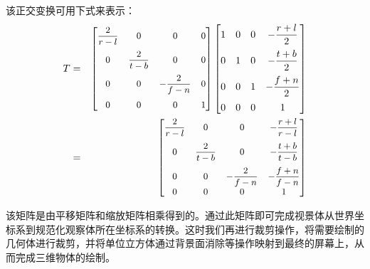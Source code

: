 该正交变换可用下式来表示：
\begin{eqnarray}       %
T& = &
\begin{small}
\begin{bmatrix}
\vspace{0.2cm}
    \displaystyle\frac{2}{r-l} & 0 & 0 & 0\\  %
\vspace{0.2cm}
    0 & \displaystyle\frac{2}{t-b} & 0 & 0\\  %
\vspace{0.2cm}
    0 & 0 & \displaystyle-\frac{2}{f-n} & 0\\  %
    0 & 0 & 0 & 1\\%
\end{bmatrix}
\end{small}
\begin{bmatrix}
\vspace{0.2cm}
    1 & 0 & 0 & \displaystyle-\frac{r+l}{2}\\  %
\vspace{0.2cm}
    0 & 1 & 0 & \displaystyle-\frac{t+b}{2}\\  %
\vspace{0.2cm}
    0 & 0 & 1 & \displaystyle-\frac{f+n}{2}\\  %
    0 & 0 & 0 & 1\\%
\end{bmatrix}  \notag \\
&= & 
\begin{small}
\begin{bmatrix}
\vspace{0.2cm}
    \displaystyle\frac{2}{r-l} & 0 & 0 & \displaystyle-\frac{r+l}{r-l}\\  %
\vspace{0.2cm}
    0 & \displaystyle\frac{2}{t-b} & 0 & \displaystyle-\frac{t+b}{t-b}\\  %
    0 & 0 & \displaystyle-\frac{2}{f-n} & \displaystyle-\frac{f+n}{f-n}\\  %
    0 & 0 & 0 & \displaystyle1\\%
\end{bmatrix} 
\end{small}
\end{eqnarray}

该矩阵是由平移矩阵和缩放矩阵相乘得到的。通过此矩阵即可完成视景体从世界坐标系到规范化观察体所在坐标系的转换。这时我们再进行裁剪操作，将需要绘制的几何体进行裁剪，并将单位立方体通过背景面消除等操作映射到最终的屏幕上，从而完成三维物体的绘制。

